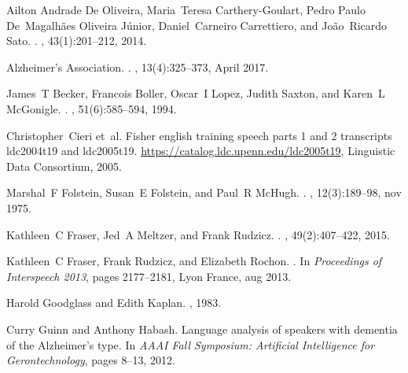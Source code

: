 \documentclass{article}
\begin{document}
\begin{thebibliography}{10}

Ailton {Andrade De Oliveira}, Maria~Teresa Carthery-Goulart, Pedro Paulo
  De~Magalh{\~{a}}es {Oliveira J{\'{u}}nior}, Daniel~Carneiro Carrettiero, and
  Jo{\~{a}}o~Ricardo Sato.
.
, 43(1):201--212, 2014.

Alzheimer's Association.
.
, 13(4):325--373, April 2017.

James~T Becker, Francois Boller, Oscar~I Lopez, Judith Saxton, and Karen~L
  McGonigle.
.
, 51(6):585--594, 1994.

Christopher~Cieri et~al.
\newblock Fisher english training speech parts 1 and 2 transcripts ldc2004t19
  and ldc2005t19.
\newblock \url{https://catalog.ldc.upenn.edu/ldc2005t19}, Linguistic Data
  Consortium, 2005.

Marshal~F Folstein, Susan~E Folstein, and Paul~R McHugh.
.
, 12(3):189--98, nov 1975.

Kathleen~C Fraser, Jed~A Meltzer, and Frank Rudzicz.
.
, 49(2):407--422, 2015.

Kathleen~C Fraser, Frank Rudzicz, and Elizabeth Rochon.
.
\newblock In {\em Proceedings of Interspeech 2013}, pages 2177--2181, Lyon
  France, aug 2013.

Harold Goodglass and Edith Kaplan.
, 1983.

Curry Guinn and Anthony Habash.
\newblock Language analysis of speakers with dementia of the {A}lzheimer's
  type.
\newblock In {\em AAAI Fall Symposium: Artificial Intelligence for
  Gerontechnology}, pages 8--13, 2012.


\end{thebibliography}
\end{document}
